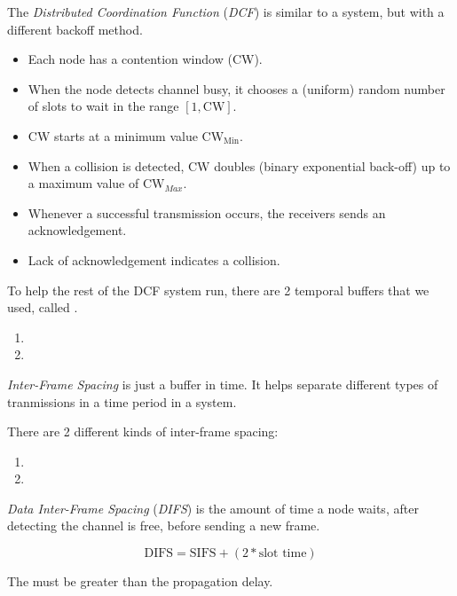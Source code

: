 \begin{definition}\label{def:WiFi_DCF}
  The \emph{Distributed Coordination Function} (\emph{DCF}) is similar to a   system, but with a different backoff method.
  \begin{itemize}[noitemsep]
  \item Each node has a contention window (CW).
  \item When the node detects channel busy, it chooses a (uniform) random number of slots to wait in the range $[1, \mathrm{CW}]$.
  \item $\mathrm{CW}$ starts at a minimum value $\mathrm{CW}_{\mathrm{Min}}$.
  \item When a collision is detected, $\mathrm{CW}$ doubles (binary exponential back-off) up to a maximum value of $\mathrm{CW}_{Max}$.
  \item Whenever a successful transmission occurs, the receivers sends an acknowledgement.
  \item Lack of acknowledgement indicates a collision.
  \end{itemize}

  To help the rest of the DCF system run, there are 2 temporal buffers that we used, called .
  \begin{enumerate}[noitemsep]
  \item {}
  \item {}
  \end{enumerate}
\end{definition}

\begin{definition}\label{def:Inter_Frame_Spacing}
  \emph{Inter-Frame Spacing} is just a buffer in time.
  It helps separate different types of tranmissions in a time period in a  system.

  There are 2 different kinds of inter-frame spacing:
  \begin{enumerate}[noitemsep]
  \item {}
  \item {}
  \end{enumerate}
\end{definition}

\begin{definition}\label{def:DIFS}
  \emph{Data Inter-Frame Spacing} (\emph{DIFS}) is the amount of time a node waits, after detecting the channel is free, before sending a new frame.

  \begin{equation}\label{eq:DIFS_Time_Amount}
    \mathrm{DIFS} = \mathrm{SIFS} + (2 * \text{slot time})
  \end{equation}

  \begin{remark}
    The  must be greater than the propagation delay.
  \end{remark}
\end{definition}

